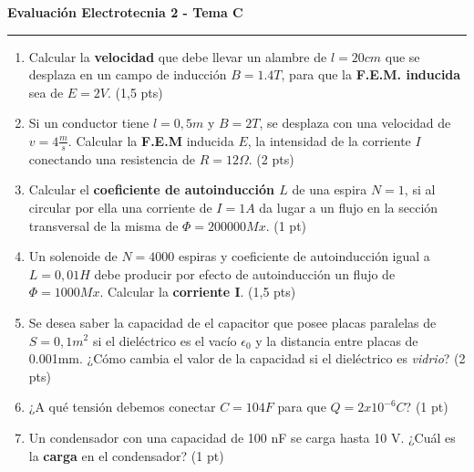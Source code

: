 \documentclass[a4paper,10pt]{article}
\begin{document}
\begin{minipage}[t][0.48\textheight][t]{0.48\textwidth}
  \centering \textbf{Evaluación Electrotecnia 2 - Tema C} \\
  \rule{\textwidth}{0.4pt}
  \begin{enumerate}
    \item Calcular la \textbf{velocidad} que debe llevar un alambre
      de $l=20cm$ que se desplaza en un campo de inducción
      $B=1.4T$, para que la \textbf{F.E.M. inducida} sea de $E=2V$. (1,5 pts)
    \item Si un conductor tiene $l=0,5m$ y $B=2T$, se desplaza con
      una velocidad de $v=4\frac{m}{s}$.
      Calcular la \textbf{F.E.M} inducida $E$, la intensidad de la
      corriente $I$ conectando una resistencia de $R=12\Omega$. (2 pts)
    \item Calcular el \textbf{coeficiente de autoinducción $L$} de
      una espira $N=1$, si al circular por ella una corriente de
      $I=1A$ da lugar a un flujo en la sección transversal de la
      misma de $\Phi=200000Mx$. (1 pt)
    \item Un solenoide de $N=4000$ espiras y coeficiente de
      autoinducción igual a $L=0,01H$ debe producir por efecto de
      autoinducción un flujo de $\Phi=1000Mx$. Calcular la
      \textbf{corriente I}. (1,5 pts)
    \item Se desea saber la capacidad de el capacitor que posee
      placas paralelas de $S=0,1m^2$ si el dieléctrico es el vacío
      $\epsilon_0$ y la distancia entre placas de 0.001mm. ¿Cómo
      cambia el valor de la capacidad si el dieléctrico es
      \emph{vidrio}? (2 pts)
    \item ¿A qué tensión debemos conectar $C=104F$
      para que $Q=2x10^{-6}C$? (1 pt)
    \item Un condensador con una capacidad de 100 nF se carga hasta
      10 V. ¿Cuál es la \textbf{carga} en el condensador? (1 pt)
  \end{enumerate}
\end{minipage}
\hfill
\end{document}
